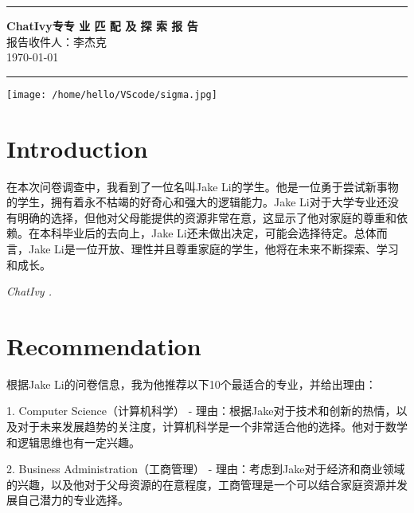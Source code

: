 \documentclass{extarticle}
\begin{document}
\thispagestyle{empty} 
\begin{CJK*}{UTF8}{gbsn}
\noindent\textcolor{darkblue}{\rule{\textwidth}{3pt}}

\hspace*{0.0cm}\textbf{ChatIvy专专 业 匹 配 及 探 索 报 告} \\ 
\hspace*{0.5cm}\normalsize 报告收件人：李杰克 \\ 
\hspace*{0.5cm}\today

\noindent\textcolor{darkblue}{\rule{\textwidth}{3pt}}
\begin{center}
    \centering
    \texttt{[image: /home/hello/VScode/sigma.jpg]}
    \end{center}
   
\newpage
\fancyfoot[C]{\thepage}
\section{Introduction}
在本次问卷调查中，我看到了一位名叫Jake Li的学生。他是一位勇于尝试新事物的学生，拥有着永不枯竭的好奇心和强大的逻辑能力。Jake Li对于大学专业还没有明确的选择，但他对父母能提供的资源非常在意，这显示了他对家庭的尊重和依赖。在本科毕业后的去向上，Jake Li还未做出决定，可能会选择待定。总体而言，Jake Li是一位开放、理性并且尊重家庭的学生，他将在未来不断探索、学习和成长。
\begin{flushleft}
\textit{ChatIvy .}
\end{flushleft}
\newpage
\section{Recommendation}
根据Jake Li的问卷信息，我为他推荐以下10个最适合的专业，并给出理由：

1. Computer Science（计算机科学）
   - 理由：根据Jake对于技术和创新的热情，以及对于未来发展趋势的关注度，计算机科学是一个非常适合他的选择。他对于数学和逻辑思维也有一定兴趣。

2. Business Administration（工商管理）
   - 理由：考虑到Jake对于经济和商业领域的兴趣，以及他对于父母资源的在意程度，工商管理是一个可以结合家庭资源并发展自己潜力的专业选择。


\end{CJK*}
\end{document}
